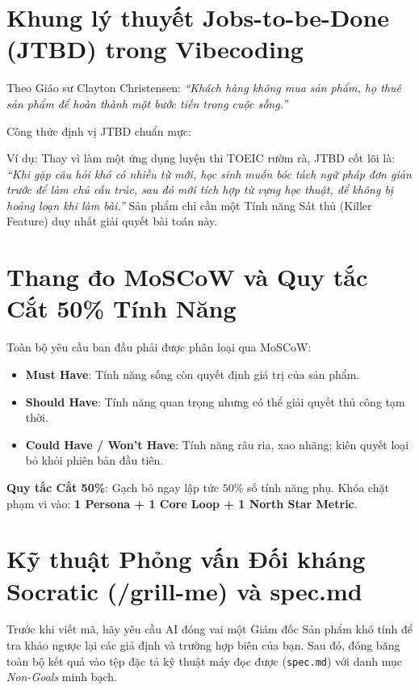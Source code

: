 \documentclass[a4paper,11pt]{report}
\begin{document}
\section{Khung lý thuyết Jobs-to-be-Done (JTBD) trong Vibecoding}
Theo Giáo sư Clayton Christensen: \textit{``Khách hàng không mua sản phẩm, họ thuê sản phẩm để hoàn thành một bước tiến trong cuộc sống.''}

Công thức định vị JTBD chuẩn mực:
\begin{center}
\end{center}

Ví dụ: Thay vì làm một ứng dụng luyện thi TOEIC rườm rà, JTBD cốt lõi là: \textit{``Khi gặp câu hỏi khó có nhiều từ mới, học sinh muốn bóc tách ngữ pháp đơn giản trước để làm chủ cấu trúc, sau đó mới tích hợp từ vựng học thuật, để không bị hoảng loạn khi làm bài.''} Sản phẩm chỉ cần một Tính năng Sát thủ (Killer Feature) duy nhất giải quyết bài toán này.

\section{Thang đo MoSCoW và Quy tắc Cắt 50\% Tính Năng}
Toàn bộ yêu cầu ban đầu phải được phân loại qua MoSCoW:
\begin{itemize}[leftmargin=1.5em]
    \item \textbf{Must Have}: Tính năng sống còn quyết định giá trị của sản phẩm.
    \item \textbf{Should Have}: Tính năng quan trọng nhưng có thể giải quyết thủ công tạm thời.
    \item \textbf{Could Have / Won't Have}: Tính năng râu ria, xao nhãng; kiên quyết loại bỏ khỏi phiên bản đầu tiên.
\end{itemize}
\textbf{Quy tắc Cắt 50\%}: Gạch bỏ ngay lập tức $50\%$ số tính năng phụ. Khóa chặt phạm vi vào: \textbf{1 Persona + 1 Core Loop + 1 North Star Metric}.

\section{Kỹ thuật Phỏng vấn Đối kháng Socratic (/grill-me) và spec.md}
Trước khi viết mã, hãy yêu cầu AI đóng vai một Giám đốc Sản phẩm khó tính để tra khảo ngược lại các giả định và trường hợp biên của bạn. Sau đó, đóng băng toàn bộ kết quả vào tệp đặc tả kỹ thuật máy đọc được (\texttt{spec.md}) với danh mục \textit{Non-Goals} minh bạch.
\end{document}
